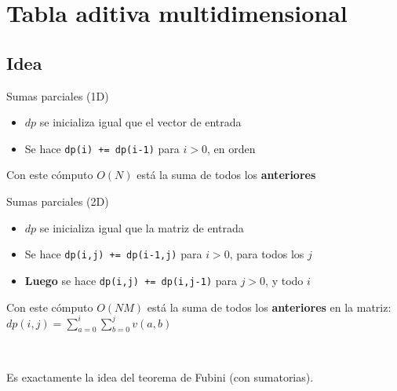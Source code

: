 \documentclass{beamer}
\begin{document}
\section{Tabla aditiva multidimensional}

\subsection{Idea}

\begin{frame}{Sumas parciales (1D)}
    \begin{itemize}
		\item $dp$ se inicializa igual que el vector de entrada 
        \item Se hace \texttt{dp(i) += dp(i-1)} para $i > 0$, en orden
    \end{itemize}
    Con este cómputo $O(N)$ está la suma de todos los \textbf{anteriores}
\end{frame}

\begin{frame}{Sumas parciales (2D)}
    \begin{itemize}
		\item $dp$ se inicializa igual que la matriz de entrada
        \item Se hace \texttt{dp(i,j) += dp(i-1,j)} para $i > 0$, para todos los $j$
        \item \textbf{Luego} se hace \texttt{dp(i,j) += dp(i,j-1)} para $j > 0$, y todo $i$
    \end{itemize}
    Con este cómputo $O(NM)$ está la suma de todos los \textbf{anteriores} en la matriz: $dp(i,j) = \sum_{a=0}^{i} \sum_{b=0}^{j}{v(a,b)}$
    
    \ 
    
    Es exactamente la idea del teorema de Fubini (con sumatorias).
\end{frame}
\end{document}
